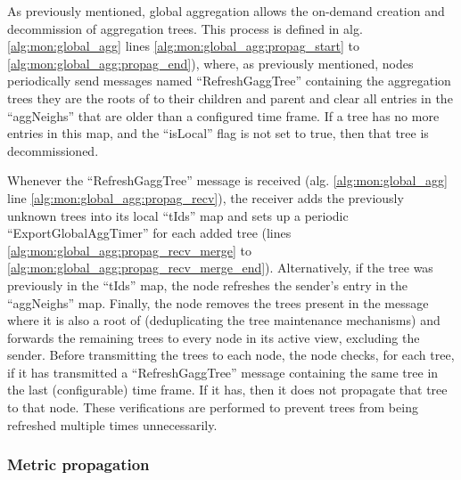 As previously mentioned, global aggregation allows the on-demand creation and decommission of aggregation trees. This process is defined in alg. \ref{alg:mon:global_agg} lines \ref{alg:mon:global_agg:propag_start} to \ref{alg:mon:global_agg:propag_end}), where, as previously mentioned, nodes periodically send messages named ``RefreshGaggTree'' containing the aggregation trees they are the roots of to their children and parent and clear all entries in the ``aggNeighs'' that are older than a configured time frame. If a tree has no more entries in this map, and the ``isLocal'' flag is not set to true, then that tree is decommissioned.


Whenever the ``RefreshGaggTree'' message is received (alg. \ref{alg:mon:global_agg} line \ref{alg:mon:global_agg:propag_recv}), the receiver adds the previously unknown trees into its local ``tIds'' map and sets up a periodic ``ExportGlobalAggTimer'' for each added tree (lines \ref{alg:mon:global_agg:propag_recv_merge} to \ref{alg:mon:global_agg:propag_recv_merge_end}). Alternatively, if the tree was previously in the ``tIds'' map, the node refreshes the sender's entry in the ``aggNeighs'' map. Finally, the node removes the trees present in the message where it is also a root of (deduplicating the tree maintenance mechanisms) and forwards the remaining trees to every node in its active view, excluding the sender. Before transmitting the trees to each node, the node checks, for each tree, if it has transmitted a ``RefreshGaggTree'' message containing the same tree in the last (configurable) time frame. If it has, then it does not propagate that tree to that node. These verifications are performed to prevent trees from being refreshed multiple times unnecessarily. 

\subsubsection{Metric propagation}

